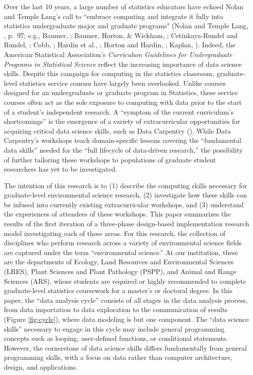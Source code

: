 \documentclass[12pt]{article}
\begin{document}
\quad Over the last 10 years, a large number of statistics educators have echoed
Nolan and Temple Lang's call to ``embrace computing and integrate it fully into 
statistics undergraduate major and graduate programs" (Nolan and Temple Lang, 
\citeyear{nolan}, p.\ 97; e.g., Baumer, \citeyear{baumer_datascience}; Baumer, Horton, 
\& Wickham, \citeyear{horton_takingachance}; Cetinkaya-Rundel and Rundel, 
\citeyear{mine}; Cobb, \citeyear{cobb}; Hardin et al., \citeyear{hardin}; Horton
and Hardin, \citeyear{horton_thinkwithdata}; Kaplan, \citeyear{kaplan}). Indeed,
the American Statistical Association's \citeyear{asa} \emph{Curriculum
Guidelines for Undergraduate Programs in Statistical Science} reflect the
increasing importance of data science skills. Despite this campaign for
computing in the statistics classroom, graduate-level statistics service courses
have largely been overlooked. Unlike courses designed for an undergraduate or
graduate program in Statistics, these service courses often act as the sole
exposure to computing with data prior to the start of a student's independent
research. A ``symptom of the current curriculum's shortcomings'' 
\citep[p.\ 547]{hampton} is the emergence of a variety of extracurricular
opportunities for acquiring critical data science skills, such as Data Carpentry
(\citeyear{data-carpentry}). While Data Carpentry's workshops teach
domain-specific lessons covering the ``fundamental data skills'' needed for the
``full lifecycle of data-driven research,'' the possibility of further tailoring
these workshops to populations of graduate student researchers has yet to be
investigated.

\quad The intention of this research is to (1) describe the computing skills 
necessary for graduate-level environmental science research, (2)
investigate how these skills can be infused into currently existing
extracurricular workshops, and (3) understand the experiences of attendees of
these workshops. This paper summarizes the results of the first iteration of a 
three-phase design-based implementation research model investigating each of
these areas. For this research, the collection of disciplines who perform
research across a variety of environmental science fields are captured under the
term ``environmental science.'' At our institution, these are the departments of
Ecology, Land Resources and Environmental Sciences (LRES), Plant Sciences and
Plant Pathology (PSPP), and Animal and Range Sciences (ARS), whose students are
required or highly recommended to complete graduate-level statistics coursework
for a master's or doctoral degree. In this paper, the ``data analysis cycle''
consists of all stages in the data analysis process, from data importation to
data exploration to the communication of results (Figure \ref{fig:cycle}), where
data modeling is but one component. The ``data science skills'' necessary to
engage in this cycle may include general programming concepts such as looping,
user-defined functions, or conditional statements. However, the cornerstone of
data science skills differs fundamentally from general programming skills, with
a focus on data rather than computer architecture, design, and applications. 
\end{document}
